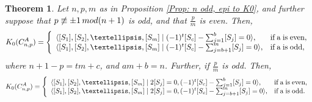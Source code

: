 \documentclass[a4paper,reqno,11pt]{amsart}
\newtheorem{theorem}{Theorem}[section]
\theoremstyle{definition}
\def \text{\mbox}
\renewcommand{\mod}{\mathop{\rm mod}\nolimits}%
\begin{document}
\begin{theorem}\label{Thm: n odd, p odd}
	Let $n,p,m$ as in Proposition \ref{Prop: n odd, epi to K0}, and further suppose that $p \not\equiv \pm 1 \mod (n+1)$ is odd, and that $\frac{p}{m}$ is even.
	Then,
\[ K_0(C_{n,p}^A) =\left\{
\begin{array}{ll}
\langle [S_1], [S_2], \ldots, [S_m] \mid (-1)^t [S_c] - \sum_{j=1}^{b} [S_j] = 0 \rangle, & \text{if\;} $a$ \text{\;is\;even},\\
		\langle [S_1], [S_2], \ldots, [S_m] \mid (-1)^t [S_c] - \sum_{j=b+1}^{m} [S_j] = 0 \rangle, & \text{if\;} $a$ \text{\;is\;odd},
\end{array}
\right.
\]	
	where $n+1-p = tm +c$, and $am+b=n$.
	Further, if $\frac{p}{m}$ is odd.
	Then,
\[ K_0(C_{n,p}^A) =\left\{
\begin{array}{ll}
\langle [S_1], [S_2], \ldots, [S_m] \mid 2[S_j] = 0, (-1)^t [S_c] - \sum_{j=1}^{b} [S_j] = 0\rangle, & \text{if\;} $a$ \text{\;is\;even},\\
		\langle [S_1], [S_2], \ldots, [S_m] \mid 2[S_j] = 0, (-1)^t [S_c] - \sum_{j=b+1}^{m} [S_j] = 0 \rangle, & \text{if\;} $a$ \text{\;is\;odd}.
\end{array}
\right.
\]	
\end{theorem}
\end{document}
